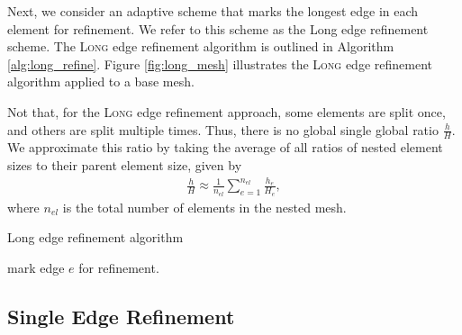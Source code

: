 Next, we consider an adaptive scheme that marks
the longest edge in each element for refinement.
We refer to this scheme as the Long edge
refinement scheme. The \textsc{Long} edge refinement
algorithm is outlined in Algorithm \ref{alg:long_refine}.
Figure \ref{fig:long_mesh} illustrates the
\textsc{Long} edge refinement algorithm applied to
a base mesh.

Not that, for the \textsc{Long} edge refinement
approach, some elements are split once, and others
are split multiple times. Thus, there is no global
single global ratio $\frac{h}{H}$. We approximate
this ratio by taking the average of all ratios
of nested element sizes to their parent element
size, given by
%
\begin{gather}
\frac{h}{H} \approx \frac{1}{n_{el}}
\sum_{e=1}^{n_{el}} \frac{h_e}{H_e},
\label{eq:refine_ratio}
\end{gather}
%
where $n_{el}$ is the total number of elements
in the nested mesh.

\begin{algorithm}
\caption{Long edge refinement algorithm}
\begin{algorithmic}
\State mark edge $e$ for refinement.
\EndIf
\EndFor
\EndFor
\end{algorithmic}
\label{alg:long_refine}
\end{algorithm}

\subsection{Single Edge Refinement}

